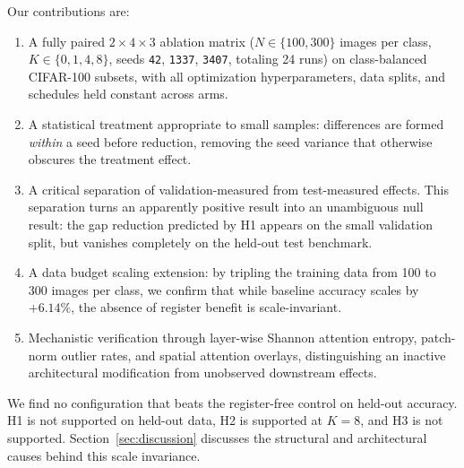 Our contributions are:

\begin{enumerate}
\item A fully paired $2 \times 4 \times 3$ ablation matrix ($N \in \{100, 300\}$ images per class, $K \in \{0, 1, 4, 8\}$, seeds \texttt{42}, \texttt{1337}, \texttt{3407}, totaling 24 runs) on class-balanced CIFAR-100 subsets, with all optimization hyperparameters, data splits, and schedules held constant across arms.
\item A statistical treatment appropriate to small samples: differences are formed \emph{within} a seed before reduction, removing the seed variance that otherwise obscures the treatment effect.
\item A critical separation of validation-measured from test-measured effects. This separation turns an apparently positive result into an unambiguous null result: the gap reduction predicted by H1 appears on the small validation split, but vanishes completely on the held-out test benchmark.
\item A data budget scaling extension: by tripling the training data from 100 to 300 images per class, we confirm that while baseline accuracy scales by $+6.14\%$, the absence of register benefit is scale-invariant.
\item Mechanistic verification through layer-wise Shannon attention entropy, patch-norm outlier rates, and spatial attention overlays, distinguishing an inactive architectural modification from unobserved downstream effects.
\end{enumerate}

We find no configuration that beats the register-free control on held-out accuracy. H1 is not supported on held-out data, H2 is supported at $K=8$, and H3 is not supported. Section~\ref{sec:discussion} discusses the structural and architectural causes behind this scale invariance.
